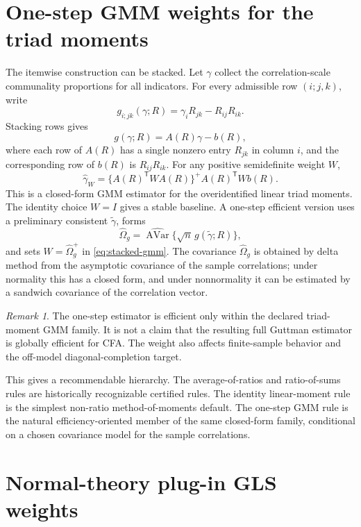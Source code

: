 \documentclass[11pt]{article}
\newcommand{\T}{^{\mathsf T}}
\theoremstyle{plain}
\theoremstyle{remark}
\newtheorem*{remark}{Remark}
\begin{document}
\section{One-step GMM weights for the triad moments}

The itemwise construction can be stacked. Let \(\gamma\) collect the
correlation-scale communality proportions for all indicators. For every
admissible row \((i;j,k)\), write
\[
  g_{i;jk}(\gamma;R)
  =
  \gamma_iR_{jk}-R_{ij}R_{ik}.
\]
Stacking rows gives
\[
  g(\gamma;R)=A(R)\gamma-b(R),
\]
where each row of \(A(R)\) has a single nonzero entry \(R_{jk}\) in column
\(i\), and the corresponding row of \(b(R)\) is \(R_{ij}R_{ik}\). For any
positive semidefinite weight \(W\),
\begin{equation}\label{eq:stacked-gmm}
  \hat\gamma_W
  =
  \{A(R)\T W A(R)\}^{+}
  A(R)\T W b(R).
\end{equation}
This is a closed-form GMM estimator for the overidentified linear triad
moments. The identity choice \(W=I\) gives a stable baseline. A one-step
efficient version uses a preliminary consistent \(\tilde\gamma\), forms
\[
  \widehat\Omega_g
  =
  \widehat{\operatorname{AVar}}\{
    \sqrt n\,g(\tilde\gamma;R)
  \},
\]
and sets \(W=\widehat\Omega_g^{+}\) in \eqref{eq:stacked-gmm}. The covariance
\(\widehat\Omega_g\) is obtained by delta method from the asymptotic covariance
of the sample correlations; under normality this has a closed form, and under
nonnormality it can be estimated by a sandwich covariance of the correlation
vector.

\begin{remark}
The one-step estimator is efficient only within the declared triad-moment GMM
family. It is not a claim that the resulting full Guttman estimator is globally
efficient for CFA. The weight also affects finite-sample behavior and the
off-model diagonal-completion target.
\end{remark}

This gives a recommendable hierarchy. The average-of-ratios and ratio-of-sums
rules are historically recognizable certified rules. The identity linear-moment
rule is the simplest non-ratio method-of-moments default. The one-step GMM rule
is the natural efficiency-oriented member of the same closed-form family,
conditional on a chosen covariance model for the sample correlations.

\section{Normal-theory plug-in GLS weights}
\end{document}
